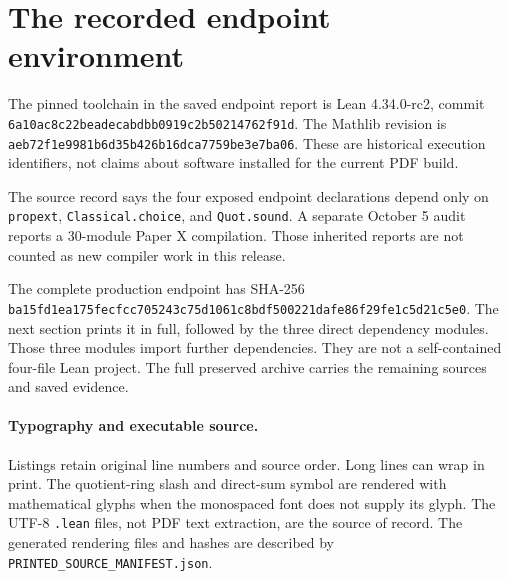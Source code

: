 \documentclass[11pt]{article}
\newcommand{\code}[1]{\nolinkurl{#1}}
\begin{document}
\KomorebiCover
\begin{abstract}
This guide explains the source contracts behind Paper X rather than treating its
terminal signature as a stand-in for the mathematics. It provides a concordance
of the twenty source records, follows the two independent construction branches,
and distinguishes arithmetic occurrence, finite trace recovery, carrier
presentations, local comparison data, and nonzero occupancy. Four complete
production modules are printed from preserved source. Their saved verification
and the limits of the present editorial replay remain explicit.
\end{abstract}
\tableofcontents
\clearpage

\clearpage
\section{The recorded endpoint environment}
The pinned toolchain in the saved endpoint report is Lean 4.34.0-rc2, commit
\code{6a10ac8c22beadecabdbb0919c2b50214762f91d}. The Mathlib revision is
\code{aeb72f1e9981b6d35b426b16dca7759be3e7ba06}. These are historical execution
identifiers, not claims about software installed for the current PDF build.

The source record says the four exposed endpoint declarations depend only on
\code{propext}, \code{Classical.choice}, and \code{Quot.sound}. A separate
October 5 audit reports a 30-module Paper X compilation. Those inherited reports
are not counted as new compiler work in this release.

The complete production endpoint has SHA-256
\code{ba15fd1ea175fecfcc705243c75d1061c8bdf500221dafe86f29fe1c5d21c5e0}.
The next section prints it in full, followed by the three direct dependency
modules. Those three modules import further dependencies. They are not a
self-contained four-file Lean project. The full preserved archive carries the
remaining sources and saved evidence.

\paragraph{Typography and executable source.}
Listings retain original line numbers and source order. Long lines can wrap in
print. The quotient-ring slash and direct-sum symbol are rendered with mathematical glyphs when the
monospaced font does not supply its glyph. The UTF-8 \code{.lean} files, not
PDF text extraction, are the source of record. The generated rendering files
and hashes are described by \code{PRINTED_SOURCE_MANIFEST.json}.
\end{document}
